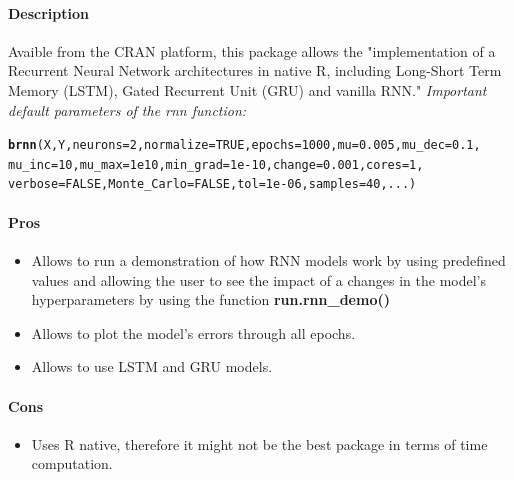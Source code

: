 \documentclass[letter]{article}\usepackage[]{graphicx}\usepackage[]{color}
\makeatletter
\newcommand{\hlnum}[1]{\textcolor[rgb]{0.686,0.059,0.569}{#1}}%
\newcommand{\hlstd}[1]{\textcolor[rgb]{0.345,0.345,0.345}{#1}}%
\newcommand{\hlkwc}[1]{\textcolor[rgb]{0.333,0.667,0.333}{#1}}%
\newcommand{\hlkwd}[1]{\textcolor[rgb]{0.737,0.353,0.396}{\textbf{#1}}}%
\newenvironment{kframe}{%
 \def\at@end@of@kframe{}%
 \ifinner\ifhmode%
  \def\at@end@of@kframe{\end{minipage}}%
  \begin{minipage}{\columnwidth}%
 \fi\fi%
 \def\FrameCommand##1{\hskip\@totalleftmargin \hskip-\fboxsep
 \colorbox{shadecolor}{##1}\hskip-\fboxsep
     \hskip-\linewidth \hskip-\@totalleftmargin \hskip\columnwidth}%
 \MakeFramed {\advance\hsize-\width
   \@totalleftmargin\z@ \linewidth\hsize
   \@setminipage}}%
 {\par\unskip\endMakeFramed%
 \at@end@of@kframe}
\newenvironment{knitrout}{}{} %
\makeatother
\begin{document}
\paragraph{Description}
Avaible from the CRAN platform, this package allows the "implementation of a Recurrent Neural Network architectures in native R, including Long-Short Term Memory (LSTM), Gated Recurrent Unit (GRU) and vanilla RNN." 
\textit{Important default parameters of the rnn function:}
\begin{knitrout}
\color{fgcolor}\begin{kframe}
\begin{alltt}
\hlkwd{brnn}\hlstd{(X,Y,}\hlkwc{neurons}\hlstd{=}\hlnum{2}\hlstd{,}\hlkwc{normalize}\hlstd{=}\hlnum{TRUE}\hlstd{,}\hlkwc{epochs}\hlstd{=}\hlnum{1000}\hlstd{,}\hlkwc{mu}\hlstd{=}\hlnum{0.005}\hlstd{,}\hlkwc{mu_dec}\hlstd{=}\hlnum{0.1}\hlstd{,}
\hlkwc{mu_inc}\hlstd{=}\hlnum{10}\hlstd{,}\hlkwc{mu_max}\hlstd{=}\hlnum{1e10}\hlstd{,}\hlkwc{min_grad}\hlstd{=}\hlnum{1e-10}\hlstd{,}\hlkwc{change} \hlstd{=} \hlnum{0.001}\hlstd{,}\hlkwc{cores}\hlstd{=}\hlnum{1}\hlstd{,}
\hlkwc{verbose}\hlstd{=}\hlnum{FALSE}\hlstd{,}\hlkwc{Monte_Carlo} \hlstd{=} \hlnum{FALSE}\hlstd{,}\hlkwc{tol} \hlstd{=} \hlnum{1e-06}\hlstd{,} \hlkwc{samples} \hlstd{=} \hlnum{40}\hlstd{,...)}
\end{alltt}
\end{kframe}
\end{knitrout}

\paragraph{Pros}
\begin{itemize}
\item Allows to run a demonstration of how RNN models work by using predefined values and allowing the user to see the impact of a changes in the model's hyperparameters by using the function \textbf{run.rnn\_demo()}
\item Allows to plot the model's errors through all epochs.
\item Allows to use LSTM and GRU models.
\end{itemize}
\paragraph{Cons}
\begin{itemize}
\item Uses R native, therefore it might not be the best package in terms of time computation.
\end{itemize}
\end{document}
